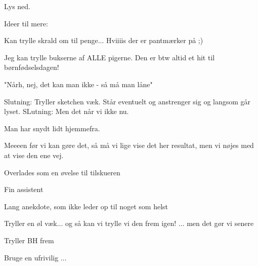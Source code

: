 \documentclass[a4paper,11pt]{article}
\begin{document}
\begin{sketch}
\scene Lys ned.

\scene Ideer til mere:

Kan trylle skrald om til penge...  Hviiiis der er pantmærker på ;)

Jeg kan trylle bukserne af ALLE pigerne. Den er btw altid et hit til børnfødselsdagen!

"Nårh, nej, det kan man ikke - så må man låne"


Slutning: Tryller sketchen væk. Står eventuelt og anstrenger sig og langsom går lyset.
SLutning: Men det når vi ikke nu.




Man har snydt lidt hjemmefra. 

Meeeen før vi kan gøre det, så må vi lige vise det her resultat, men vi nøjes med at vise den ene vej. 

Overlades som en øvelse til tilskueren



Fin assistent

Lang anekdote, som ikke leder op til noget som helst

Tryller en øl væk... og så kan vi trylle vi den frem igen! ... men det gør vi senere



Tryller BH frem

Bruge en ufrivilig ...






\end{sketch}
\end{document}
